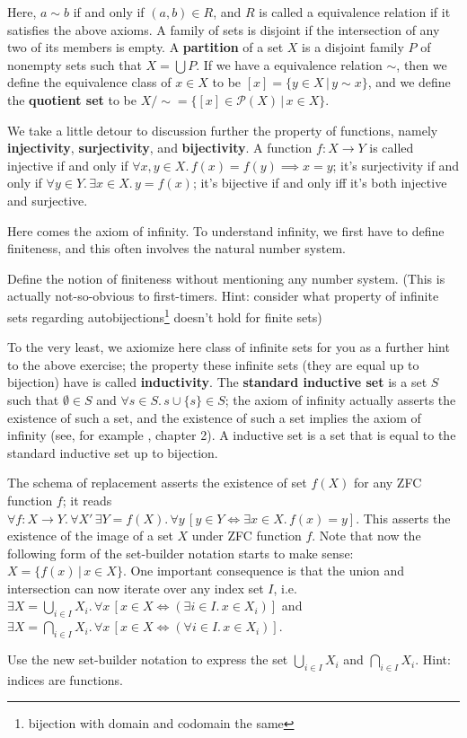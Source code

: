 \documentclass[../main.tex]{subfiles}
\begin{document}
Here, $a\sim b$ if and only if $(a,b)\in R$, and $R$ is called a equivalence relation if it satisfies the above axioms. A family of sets is disjoint if the intersection of any two of its members is empty. A \textbf{partition} of a set $X$ is a disjoint family $P$ of nonempty sets such that $X=\bigcup P$. If we have a equivalence relation $\sim$, then we define the equivalence class of $x\in X$ to be $[x]=\{y\in X\,|\,y\sim x\}$, and we define the \textbf{quotient set} to be $X/{\sim}=\{[x]\in\mathcal{P}(X)\,|\,x\in X\}$.

We take a little detour to discussion further the property of functions, namely \textbf{injectivity}, \textbf{surjectivity}, and \textbf{bijectivity}. A function $f:X\to Y$ is called injective if and only if $\forall x,y\in X.\,f(x)=f(y)\implies x=y$; it's surjectivity if and only if $\forall y\in Y.\,\exists x\in X.\,y=f(x)$; it's bijective if and only iff it's both injective and surjective.

Here comes the axiom of infinity. To understand infinity, we first have to define finiteness, and this often involves the natural number system.
\begin{exercise}
Define the notion of finiteness without mentioning any number system. (This is actually not-so-obvious to first-timers. Hint: consider what property of infinite sets regarding autobijections\footnote{bijection with domain and codomain the same} doesn't hold for finite sets)
\end{exercise}
To the very least, we axiomize here class of infinite sets for you as a further hint to the above exercise; the property these infinite sets (they are equal up to bijection) have is called \textbf{inductivity}. The \textbf{standard inductive set} is a set $S$ such that $\emptyset\in S$ and $\forall s\in S.\,s\cup\{s\}\in S$; the axiom of infinity actually asserts the existence of such a set, and the existence of such a set implies the axiom of infinity (see, for example \cite{jeshsettheory}, chapter 2). A inductive set is a set that is equal to the standard inductive set up to bijection.

The schema of replacement asserts the existence of set $f(X)$ for any ZFC function $f$; it reads $\forall f:X\to Y.\,\forall X'\,\exists Y=f(X).\,\forall y\,[y\in Y\iff\exists x\in X.\,f(x)=y]$. This asserts the existence of the image of a set $X$ under ZFC function $f$. Note that now the following form of the set-builder notation starts to make sense: $X=\{f(x)\,|\,x\in X\}$. One important consequence is that the union and intersection can now iterate over any index set $I$, i.e. $\exists X=\bigcup_{i\in I}X_i.\,\forall x\,[x\in X\iff(\exists i\in I.\,x\in X_i)]$ and $\exists X=\bigcap_{i\in I}X_i.\,\forall x\,[x\in X\iff(\forall i\in I.\,x\in X_i)]$.
\begin{exercise}
Use the new set-builder notation to express the set $\bigcup_{i\in I}X_i$ and $\bigcap_{i\in I}X_i$. Hint: indices are functions.
\end{exercise}
\end{document}
